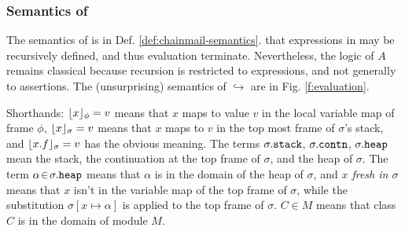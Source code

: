 \subsubsection{Semantics of \SpecO}
The semantics of \SpecO  %
is  in Def. \ref{def:chainmail-semantics}. 
 that expressions in \Loo may be recursively defined, and thus evaluation 
 terminate. Nevertheless, the logic of $A$ remains classical because recursion is restricted
to expressions, and not generally to assertions.
The (unsurprising) semantics of $\hookrightarrow$  are in Fig. \ref{f:evaluation}. 

Shorthands:  
 $\lfloor x \rfloor_{\phi} = v$  means that $x$ maps to
value $v$ in the local variable map of frame $\phi$, $\lfloor x \rfloor_{\sigma} = v$ means that $x$ 
maps to $v$ in the top most frame of $\sigma$'s stack, and $\lfloor x.f \rfloor_{\sigma} = v$
has the obvious meaning. The terms $\sigma.{\texttt{stack}}$,  
$\sigma.{\texttt{contn}}$, 
$\sigma.{\texttt{heap}}$     mean the stack, 
the continuation at the
top frame of $\sigma$, %
and the heap of $\sigma$.
The term $\alpha\!\in\!\sigma.{\texttt{heap}}$ means that $\alpha$ is in the domain of the heap of $\sigma$, and \emph{$x$ fresh in $\sigma$} means that 
$x$ isn't in the variable map of the top frame of $\sigma$, 
while the substitution  $\sigma[x \mapsto \alpha]$ is applied to the top frame of $\sigma$.
$C\in M$ means that class $C$ is in the domain of module $M$. 

